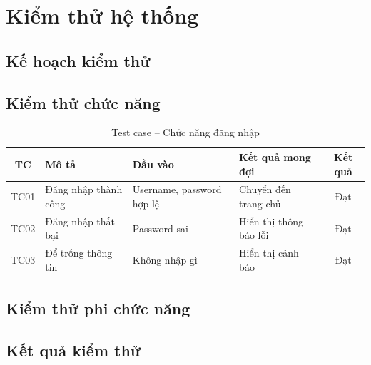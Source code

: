 
\chapter{Kiểm thử hệ thống}
\label{chap:kiem_thu}

\section{Kế hoạch kiểm thử}
\label{sec:ke_hoach_kiem_thu}



\section{Kiểm thử chức năng}
\label{sec:kiem_thu_chuc_nang}


\begin{table}[H]
    \centering
    \begin{tabularx}{\textwidth}{|c|X|X|X|c|}
        \hline
        \textbf{TC} & \textbf{Mô tả} & \textbf{Đầu vào} & \textbf{Kết quả mong đợi} & \textbf{Kết quả} \\
        \hline
        TC01 & Đăng nhập thành công & Username, password hợp lệ & Chuyển đến trang chủ & Đạt \\
        \hline
        TC02 & Đăng nhập thất bại & Password sai & Hiển thị thông báo lỗi & Đạt \\
        \hline
        TC03 & Để trống thông tin & Không nhập gì & Hiển thị cảnh báo & Đạt \\
        \hline
    \end{tabularx}
    \caption{Test case -- Chức năng đăng nhập}
    \label{tab:tc_dang_nhap}
\end{table}


\section{Kiểm thử phi chức năng}
\label{sec:kiem_thu_phi_chuc_nang}



\section{Kết quả kiểm thử}
\label{sec:ket_qua_kiem_thu}

